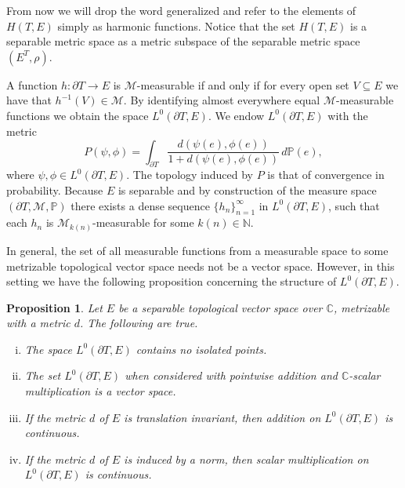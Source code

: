 \documentclass[twoside, 11pt]{article}
\newcommand{\C}{\mathbb{C}}
\newcommand{\N}{\mathbb{N}}
\renewcommand{\P}{\mathbb{P}}
\theoremstyle{plain}
\newtheorem{proposition}[theorem]{Proposition}
\theoremstyle{definition}
\begin{document}
From now we will drop the word generalized and refer to the elements of $H(T,E)$ simply as harmonic functions. Notice that the set $H(T,E)$ is a separable metric space as a metric subspace of the separable metric space $(E^T,\rho)$.

A function $h: \partial T \to E$ is $\mathcal{M}$-measurable if and only if for every open set $V \subseteq E$ we have that $h^{-1}(V) \in \mathcal{M}$.
By identifying almost everywhere equal $\mathcal{M}$-measurable functions we obtain the space $L^{0}(\partial T, E)$.
We endow $L^{0}(\partial T, E)$ with the metric
$$P(\psi,\phi) = \int_{\partial T}{\frac{d(\psi(e), \phi(e))}{1+d(\psi(e), \phi(e))}} \, d\P(e),$$
where $\psi,\phi \in L^{0}(\partial T, E)$.
The topology induced by $P$ is that of convergence in probability.
Because $E$ is separable and by construction of the measure space $(\partial T, \mathcal{M}, \P)$ there exists a dense sequence $\{h_n\}_{n=1}^{\infty}$ in $L^0(\partial T, E)$, such that each $h_n$ is $\mathcal{M}_{k(n)}$-measurable for some $k(n) \in \N$.

In general, the set of all measurable functions from a measurable space to some metrizable topological vector space needs not be a vector space.
However, in this setting we have the following proposition concerning the structure of $L^0(\partial T, E)$.

\begin{proposition}
\label{prop:struc}
Let $E$ be a separable topological vector space over $\C$, metrizable with a metric $d$.
The following are true.
\begin{enumerate}[(i)]
\item The space $L^0(\partial T, E)$ contains no isolated points.
\item The set $L^0(\partial T, E)$ when considered with pointwise addition and $\C$-scalar multiplication is a vector space.
\item If the metric $d$ of $E$ is translation invariant, then addition on $L^0(\partial T, E)$ is continuous.
\item If the metric $d$ of $E$ is induced by a norm, then scalar multiplication on $L^0(\partial T, E)$ is continuous.
\end{enumerate}
\end{proposition}
\end{document}
